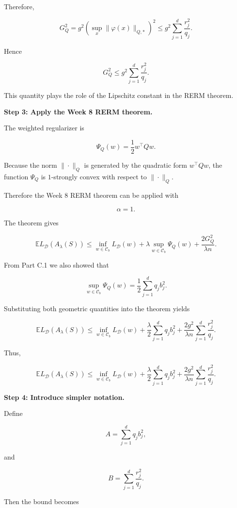 \documentclass[11pt]{article}
\newcommand{\E}{\mathbb{E}}
\begin{document}
\begin{enumerate}
\begin{solutionbox}
Therefore,

\[
G_Q^2
=
g^2
\left(
\sup_x
\|\varphi(x)\|_{Q,*}
\right)^2
\le
g^2
\sum_{j=1}^{d}
\frac{r_j^2}{q_j}.
\]

Hence

\[
\boxed{
G_Q^2
\le
g^2
\sum_{j=1}^{d}
\frac{r_j^2}{q_j}.
}
\]

This quantity plays the role of the Lipschitz constant in the RERM theorem.

\medskip

\textbf{Step 3: Apply the Week 8 RERM theorem.}

The weighted regularizer is

\[
\Psi_Q(w)
=
\frac12 w^\top Qw.
\]

Because the norm \(\|\cdot\|_Q\) is generated by the quadratic form \(w^\top Qw\), the function \(\Psi_Q\) is \(1\)-strongly convex with respect to \(\|\cdot\|_Q\).

Therefore the Week 8 RERM theorem can be applied with

\[
\alpha=1.
\]

The theorem gives

\[
\E
L_{\mathcal D}(A_\lambda(S))
\le
\inf_{w\in\mathcal C_b}
L_{\mathcal D}(w)
+
\lambda
\sup_{w\in\mathcal C_b}
\Psi_Q(w)
+
\frac{2G_Q^2}{\lambda n}.
\]

From Part C.1 we also showed that

\[
\sup_{w\in\mathcal C_b}
\Psi_Q(w)
=
\frac12
\sum_{j=1}^{d}
q_j b_j^2.
\]

Substituting both geometric quantities into the theorem yields

\[
\E
L_{\mathcal D}(A_\lambda(S))
\le
\inf_{w\in\mathcal C_b}
L_{\mathcal D}(w)
+
\frac{\lambda}{2}
\sum_{j=1}^{d}
q_j b_j^2
+
\frac{2g^2}{\lambda n}
\sum_{j=1}^{d}
\frac{r_j^2}{q_j}.
\]

Thus,

\[
\boxed{
\E
L_{\mathcal D}(A_\lambda(S))
\le
\inf_{w\in\mathcal C_b}
L_{\mathcal D}(w)
+
\frac{\lambda}{2}
\sum_{j=1}^{d}
q_j b_j^2
+
\frac{2g^2}{\lambda n}
\sum_{j=1}^{d}
\frac{r_j^2}{q_j}.
}
\]

\medskip

\textbf{Step 4: Introduce simpler notation.}

Define

\[
A
=
\sum_{j=1}^{d}
q_j b_j^2,
\]

and

\[
B
=
\sum_{j=1}^{d}
\frac{r_j^2}{q_j}.
\]

Then the bound becomes


\end{solutionbox}
\end{enumerate}
\end{document}
